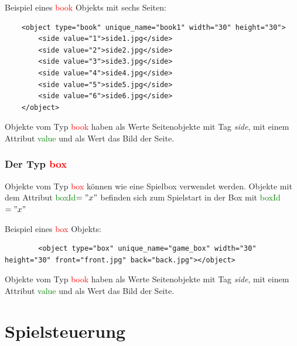 \documentclass[ngerman]{scrbook}
\newcommand{\book}{\textcolor{red}{book}\xspace}
\newcommand{\boxtype}{\textcolor{red}{box}\xspace}
\newcommand{\xmlattribute}[1]{\textcolor{green}{#1}}
\begin{document}
	Beispiel eines \book Objekts mit sechs Seiten:
	
	\lstset{language=XML}
	\begin{lstlisting}	
	<object type="book" unique_name="book1" width="30" height="30">
		<side value="1">side1.jpg</side>
		<side value="2">side2.jpg</side>
		<side value="3">side3.jpg</side>
		<side value="4">side4.jpg</side>
		<side value="5">side5.jpg</side>
		<side value="6">side6.jpg</side>
	</object>
	\end{lstlisting}
	
	Objekte vom Typ \book haben als Werte Seitenobjekte mit Tag \textit{side}, mit einem Attribut \xmlattribute{value} und als Wert das Bild der Seite.
	
		\subsection{Der Typ \boxtype}
	Objekte vom Typ \boxtype können wie eine Spielbox verwendet werden. Objekte mit dem Attribut \xmlattribute{boxId}$="x"$ befinden sich zum Spielstart in der Box mit \xmlattribute{boxId}$="x"$
	
	Beispiel eines \boxtype Objekts:
	
	\lstset{language=XML}
	\begin{lstlisting}	
		<object type="box" unique_name="game_box" width="30" height="30" front="front.jpg" back="back.jpg"></object>
	\end{lstlisting}
	
	Objekte vom Typ \book haben als Werte Seitenobjekte mit Tag \textit{side}, mit einem Attribut \xmlattribute{value} und als Wert das Bild der Seite.


	\chapter{Spielsteuerung}
\end{document}
